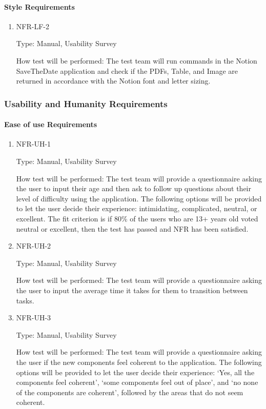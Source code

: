 \documentclass[12pt, titlepage]{article}
\begin{document}
\paragraph{Style Requirements}

\begin{enumerate}

\item{NFR-LF-2\\}

Type: Manual, Usability Survey 

How test will be performed: The test team will run commands in the Notion SaveTheDate application and check if the PDFs, Table, and Image are returned in accordance with the Notion font and letter sizing. 

\end{enumerate}

\subsubsection{Usability and Humanity Requirements}

\paragraph{Ease of use Requirements}

\begin{enumerate}

\item{NFR-UH-1\\}

Type: Manual, Usability Survey 

How test will be performed:  The test team will provide a questionnaire asking the user to input their age and then ask to follow up questions about their level of difficulty using the application. The following options will be provided to let the user decide their experience: intimidating, complicated, neutral, or excellent. The fit criterion is if 80\% of the users who are 13+ years old voted neutral or excellent, then the test has passed and NFR has been satisfied. 

\item{NFR-UH-2\\}

Type: Manual, Usability Survey 

How test will be performed: The test team will provide a questionnaire asking the user to input the average time it takes for them to transition between tasks. 

\item{NFR-UH-3\\}

Type: Manual, Usability Survey 

How test will be performed: The test team will provide a questionnaire asking the user if the new components feel coherent to the application. The following options will be provided to let the user decide their experience: ‘Yes, all the components feel coherent’, ‘some components feel out of place’, and ‘no none of the components are coherent’, followed by the areas that do not seem coherent.

\end{enumerate}
\end{document}
